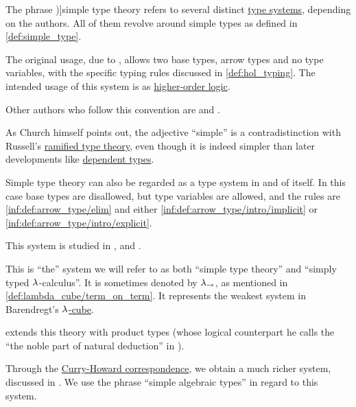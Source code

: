 \begin{concept}\label{con:simple_type_theory}
  The phrase \term[en=simple type theory (\cite[ix]{Hindley1997BasicSTT})]{simple type theory} refers to several distinct \hyperref[def:abstract_type_system]{type systems}, depending on the authors. All of them revolve around simple types as defined in \cref{def:simple_type}.

  \begin{thmenum}
     The original usage, due to , allows two base types, arrow types and no type variables, with the specific typing rules discussed in \cref{def:hol_typing}. The intended usage of this system is as \hyperref[rem:predicate_logic]{higher-order logic}.

    Other authors who follow this convention are  and .

    As Church himself points out, the adjective \enquote{simple} is a contradistinction with Russell's \hyperref[def:ramified_theory_of_types]{ramified type theory}, even though it is indeed simpler than later developments like \hyperref[con:dependent_type]{dependent types}.

     Simple type theory can also be regarded as a type system in and of itself. In this case base types are disallowed, but type variables are allowed, and the rules are \ref{inf:def:arrow_type/elim} and either \ref{inf:def:arrow_type/intro/implicit} or \ref{inf:def:arrow_type/intro/explicit}.

    This system is studied in ,  and .

    This is \enquote{the} system we will refer to as both \enquote{simple type theory} and \enquote{simply typed \( {\mathrm \lambda} \)-calculus}. It is sometimes denoted by \( {\mathrm \lambda}_{\rightarrow} \), as mentioned in \cref{def:lambda_cube/term_on_term}. It represents the weakest system in Barendregt's \hyperref[def:lambda_cube]{\( {\mathrm \lambda} \)-cube}.

     extends this theory with product types (whose logical counterpart he calls the \enquote{the noble part of natural deduction} in \cite[\S 5.3]{GirardEtAl1989ProofsAndTypes}).

     Through the \hyperref[con:curry_howard_correspondence]{Curry-Howard correspondence}, we obtain a much richer system, discussed in . We use the phrase \enquote{simple algebraic types} in regard to this system.


\end{thmenum}
\end{concept}

